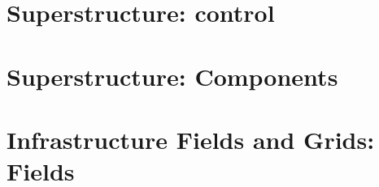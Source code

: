 \documentclass[english]{article}
\newcommand{\shortname}{GR}
\begin{document}
 


\newpage
\begin{htmlonly}
\end{htmlonly}
\part{Superstructure: control}

\setcounter{section}{0}
\renewcommand{\thesection}{\shortname\arabic{section}}
\renewcommand{\thesubsection}{\shortname\arabic{section}.\arabic{subsection}}
\renewcommand{\thesubsubsection}{\shortname\arabic{section}.\arabic{subsection}.\arabic{subsubsection}}



\newpage
\begin{htmlonly}
\end{htmlonly}
\part{Superstructure: Components}

\setcounter{section}{0}
\renewcommand{\thesection}{\shortname\arabic{section}}
\renewcommand{\thesubsection}{\shortname\arabic{section}.\arabic{subsection}}
\renewcommand{\thesubsubsection}{\shortname\arabic{section}.\arabic{subsection}.\arabic{subsubsection}}



\newpage
\begin{htmlonly}
\end{htmlonly}
\part{Infrastructure Fields and Grids: Fields}

\setcounter{section}{0}
\renewcommand{\thesection}{\shortname\arabic{section}}
\renewcommand{\thesubsection}{\shortname\arabic{section}.\arabic{subsection}}
\renewcommand{\thesubsubsection}{\shortname\arabic{section}.\arabic{subsection}.\arabic{subsubsection}}
\end{document}
